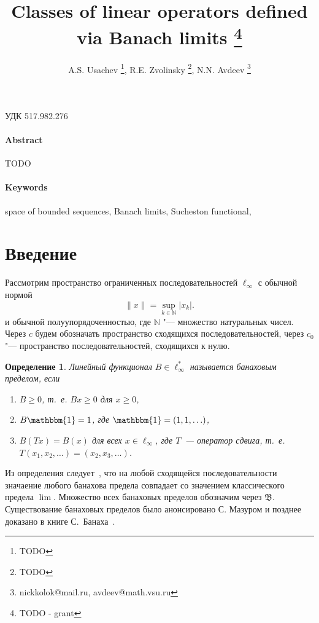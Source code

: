 \documentclass[a4paper,14pt]{article} %
\theoremstyle{plain}
\newtheorem{definition}[lemma]{Определение}
\begin{document}

\title{
	Classes of linear operators defined via Banach limits
	\footnote{
		TODO - grant
	}
}

\author{
	A.S. Usachev
	\footnote{TODO},
	R.E. Zvolinsky
	\footnote{TODO},
	N.N. Avdeev
	\footnote{nickkolok@mail.ru, avdeev@math.vsu.ru}
}

\maketitle

УДК 517.982.276 %

\paragraph{Abstract}
TODO


\paragraph{Keywords}
	space of bounded sequences,
	Banach limits,
	Sucheston functional,




\section{Введение}

Рассмотрим пространство ограниченных последовательностей $\ell_\infty$ с обычной нормой
\begin{equation*}
	\|x\| = \sup_{k\in\mathbb{N}} |x_k|
	.
\end{equation*}
и обычной полуупорядоченностью, где $\mathbb{N}$ "--- множество натуральных чисел.
Через $c$ будем обозначать пространство сходящихся последовательностей,
через $c_0$ "--- пространство последовательностей, сходящихся к нулю.


\begin{definition}
	\label{def:Banach_limit}
	Линейный функционал $B\in \ell_\infty^*$ называется банаховым пределом,
	если
	\begin{enumerate}
		\item
			$B\geq0$, т.~е. $Bx \geq 0$ для $x \geq 0$,
		\item
			$B\mathbbm{1}=1$, где $\mathbbm{1} =(1,1,\ldots)$,
		\item
			$B(Tx)=B(x)$ для всех $x\in \ell_\infty$, где $T$~---
		оператор сдвига, т.~е. $T(x_1,x_2,\ldots)=(x_2,x_3,\ldots)$.
	\end{enumerate}
\end{definition}
Из определения следует~\cite{semenov2020geomBL},
что на любой сходящейся последовательности значаение любого банахова предела
совпадает со значением классического предела $\lim$.
Множество всех банаховых пределов обозначим через $\mathfrak{B}$.
Существование банаховых пределов было анонсировано С. Мазуром \cite{Mazur} и позднее доказано в книге С.~Банаха~\cite{B}.
\end{document}
